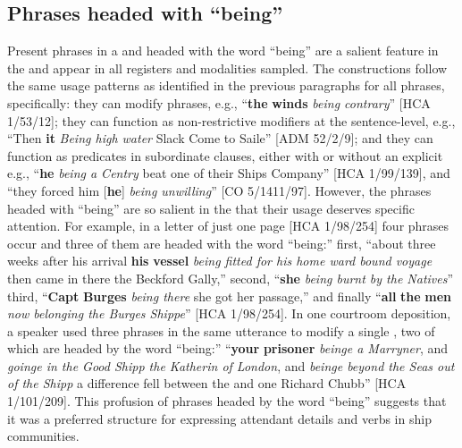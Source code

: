 \subsection{{Phrases headed with “being”}}\label{sec:5.5.3}

Present  phrases in a  and headed with the word “being” are a salient feature in the  and appear in all registers and modalities sampled. The  constructions follow the same usage patterns as identified in the previous paragraphs for all  phrases, specifically: they can modify  phrases, e.g., “\textbf{the} \textbf{winds} \textit{being contrary}” [HCA 1/53/12]; they can function as non-restrictive modifiers at the sentence-level, e.g., “Then \textbf{it} \textit{Being high water} Slack Come to Saile” [ADM 52/2/9]; and they can function as predicates in subordinate clauses, either with or without an explicit  e.g., “\textbf{he} \textit{being a Centry} beat one of their Ships Company” [HCA 1/99/139], and “they forced him [\textbf{he}] \textit{being unwilling}” [CO 5/1411/97]. However, the  phrases headed with “being” are so salient in the  that their usage deserves specific attention. For example, in a letter of just one page [HCA 1/98/254] four  phrases occur and three of them are headed with the word “being:” first, “about three weeks after his arrival \textbf{his} \textbf{vessel} \textit{being fitted for his home ward bound voyage} then came in there the Beckford Gally,” second, “\textbf{she} \textit{being burnt by the Natives}” third, “\textbf{Capt} \textbf{Burges} \textit{being there} she got her passage,” and finally “\textbf{all} \textbf{the} \textbf{men} \textit{now belonging the Burges Shippe}” [HCA 1/98/254]. In one courtroom deposition, a speaker used three  phrases in the same utterance to modify a single , two of which are headed by the word “being:” “\textbf{your} \textbf{prisoner} \textit{beinge a Marryner}, and \textit{goinge in the Good Shipp the Katherin of London}, and \textit{beinge beyond the Seas out of the Shipp} a difference fell between the  and one Richard Chubb” [HCA 1/101/209]. This profusion of  phrases headed by the word “being” suggests that it was a preferred structure for expressing attendant details and  verbs in ship communities. 

